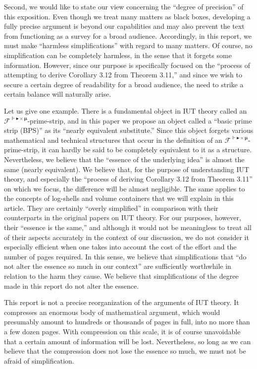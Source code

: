 \documentclass[12pt, reqno, a4paper]{amsart}
\def\cF{{\mathcal{F}}}
\begin{document}
Second, we would like to state our view concerning the ``degree of precision'' of this exposition. Even though we treat many matters as black boxes, developing a fully precise argument is beyond our capabilities and may also prevent the text from functioning as a survey for a broad audience. Accordingly, in this report, we must make ``harmless simplifications'' with regard to many matters. Of course, no simplification can be completely harmless, in the sense that it forgets some information. However, since our purpose is specifically focused on the ``process of attempting to derive Corollary 3.12 from Theorem 3.11,'' and since we wish to secure a certain degree of readability for a broad audience, the need to strike a certain balance will naturally arise.

Let us give one example. There is a fundamental object in IUT theory called an $\cF^{\Vdash\blacktriangleright\times\bm{\mu}}$-prime-strip, and in this paper we propose an object called a ``basic prime strip (BPS)'' as its ``nearly equivalent substitute.'' Since this object forgets various mathematical and technical structures that occur in the definition of an $\cF^{\Vdash\blacktriangleright\times\bm{\mu}}$-prime-strip, it can hardly be said to be completely equivalent to it as a structure. Nevertheless, we believe that the ``essence of the underlying idea'' is almost the same (nearly equivalent). We believe that, for the purpose of understanding IUT theory, and especially the ``process of deriving Corollary 3.12 from Theorem 3.11'' on which we focus, the difference will be almost negligible. The same applies to the concepts of log-shells and volume containers that we will explain in this article. They are certainly ``overly simplified'' in comparison with their counterparts in the original papers on IUT theory. For our purposes, however, their ``essence is the same,'' and although it would not be meaningless to treat all of their aspects accurately in the context of our discussion, we do not consider it especially efficient when one takes into account the cost of the effort and the number of pages required. In this sense, we believe that simplifications that ``do not alter the essence so much in our context'' are sufficiently worthwhile in relation to the harm they cause. We believe that simplifications of the degree made in this report do not alter the essence.

This report is not a precise reorganization of the arguments of IUT theory. It compresses an enormous body of mathematical argument, which would presumably amount to hundreds or thousands of pages in full, into no more than a few dozen pages. With compression on this scale, it is of course unavoidable that a certain amount of information will be lost. Nevertheless, so long as we can believe that the compression does not lose the essence so much, we must not be afraid of simplification.
\end{document}
